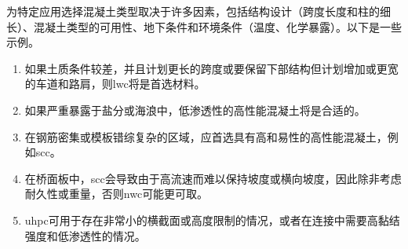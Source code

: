 为特定应用选择混凝土类型取决于许多因素，包括结构设计（跨度长度和柱的细长）、混凝土类型的可用性、地下条件和环境条件（温度、化学暴露）。以下是一些示例。
\begin{enumerate}
  \item 如果土质条件较差，并且计划更长的跨度或要保留下部结构但计划增加或更宽的车道和路肩，则\acrlong*{lwc}将是首选材料。
  \item 如果严重暴露于盐分或海浪中，低渗透性的高性能混凝土将是合适的。
  \item 在钢筋密集或模板错综复杂的区域，应首选具有高和易性的高性能混凝土，例如\acrfull*{scc}。
  \item 在桥面板中，\acrlong*{scc}会导致由于高流速而难以保持坡度或横向坡度，因此除非考虑耐久性或重量，否则\acrfull*{nwc}可能更可取。
  \item \acrfull*{uhpc}可用于存在非常小的横截面或高度限制的情况，或者在连接中需要高黏结强度和低渗透性的情况。
\end{enumerate}

